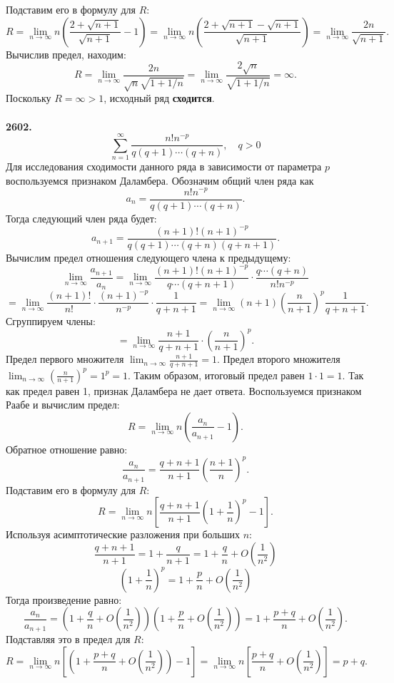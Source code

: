 \documentclass[a4paper, 12pt]{report}
\numberwithin{equation}{section}
\begin{document}
	Подставим его в формулу для $R$:
	$$ R = \lim_{n \to \infty} n \left( \frac{2+\sqrt{n+1}}{\sqrt{n+1}} - 1 \right) = \lim_{n \to \infty} n \left( \frac{2+\sqrt{n+1}-\sqrt{n+1}}{\sqrt{n+1}} \right) = \lim_{n \to \infty} \frac{2n}{\sqrt{n+1}}. $$
	Вычислив предел, находим:
	$$ R = \lim_{n \to \infty} \frac{2n}{\sqrt{n}\sqrt{1+1/n}} = \lim_{n \to \infty} \frac{2\sqrt{n}}{\sqrt{1+1/n}} = \infty. $$
	Поскольку $R = \infty > 1$, исходный ряд \textbf{сходится}.
	\\\\
	\textbf{2602.}
	$$ \sum_{n=1}^{\infty} \frac{n! n^{-p}}{q(q+1)\cdots(q+n)}, \quad q > 0 $$
	Для исследования сходимости данного ряда в зависимости от параметра $p$ воспользуемся признаком Даламбера. Обозначим общий член ряда как
	$$ a_n = \frac{n! n^{-p}}{q(q+1)\cdots(q+n)}. $$
	Тогда следующий член ряда будет:
	$$ a_{n+1} = \frac{(n+1)! (n+1)^{-p}}{q(q+1)\cdots(q+n)(q+n+1)}. $$
	Вычислим предел отношения следующего члена к предыдущему:
	$$ \lim_{n \to \infty} \frac{a_{n+1}}{a_n} = \lim_{n \to \infty} \frac{(n+1)! (n+1)^{-p}}{q\cdots(q+n+1)} \cdot \frac{q\cdots(q+n)}{n! n^{-p}} $$
	$$ = \lim_{n \to \infty} \frac{(n+1)!}{n!} \cdot \frac{(n+1)^{-p}}{n^{-p}} \cdot \frac{1}{q+n+1} = \lim_{n \to \infty} (n+1) \left(\frac{n}{n+1}\right)^p \frac{1}{q+n+1}. $$
	Сгруппируем члены:
	$$ = \lim_{n \to \infty} \frac{n+1}{q+n+1} \cdot \left(\frac{n}{n+1}\right)^p. $$
	Предел первого множителя $\lim_{n \to \infty} \frac{n+1}{q+n+1} = 1$. Предел второго множителя $\lim_{n \to \infty} \left(\frac{n}{n+1}\right)^p = 1^p = 1$. Таким образом, итоговый предел равен $1 \cdot 1 = 1$.
	Так как предел равен 1, признак Даламбера не дает ответа. Воспользуемся признаком Раабе и вычислим предел:
	$$ R = \lim_{n \to \infty} n \left( \frac{a_n}{a_{n+1}} - 1 \right). $$
	Обратное отношение равно:
	$$ \frac{a_n}{a_{n+1}} = \frac{q+n+1}{n+1} \left(\frac{n+1}{n}\right)^p. $$
	Подставим его в формулу для $R$:
	$$ R = \lim_{n \to \infty} n \left[ \frac{q+n+1}{n+1} \left(1 + \frac{1}{n}\right)^p - 1 \right]. $$
	Используя асимптотические разложения при больших $n$:
	$$ \frac{q+n+1}{n+1} = 1 + \frac{q}{n+1} = 1+\frac{q}{n} + O\left(\frac{1}{n^2}\right) $$
	$$ \left(1 + \frac{1}{n}\right)^p = 1+\frac{p}{n} + O\left(\frac{1}{n^2}\right) $$
	Тогда произведение равно:
	$$ \frac{a_n}{a_{n+1}} = \left(1+\frac{q}{n} + O\left(\frac{1}{n^2}\right)\right)\left(1+\frac{p}{n} + O\left(\frac{1}{n^2}\right)\right) = 1 + \frac{p+q}{n} + O\left(\frac{1}{n^2}\right). $$
	Подставляя это в предел для $R$:
	$$ R = \lim_{n \to \infty} n \left[ \left(1 + \frac{p+q}{n} + O\left(\frac{1}{n^2}\right)\right) - 1 \right] = \lim_{n \to \infty} n \left[ \frac{p+q}{n} + O\left(\frac{1}{n^2}\right) \right] = p+q. $$
\end{document}
